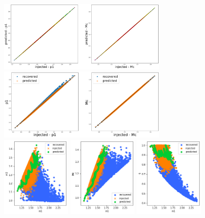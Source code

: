 \documentclass[prd,aps,twocolumn,a4paper,showkeys,nofootinbib]{article}
\begin{document}
%
\begin{figure}[]
  \center
  \includegraphics[width=0.75\textwidth]{./Figs/GstLAL_p_regression.png}
  \includegraphics[width=0.75\textwidth]{./Figs/GstLAL_p_regression_noise.png}
  \includegraphics[width=0.31\textwidth]{./Figs/GstLAL_p_m2.png}
  \includegraphics[width=0.31\textwidth]{./Figs/GstLAL_p_Mc.png}
  \includegraphics[width=0.31\textwidth]{./Figs/GstLAL_p_q.png}

\end{figure}
\end{document}
